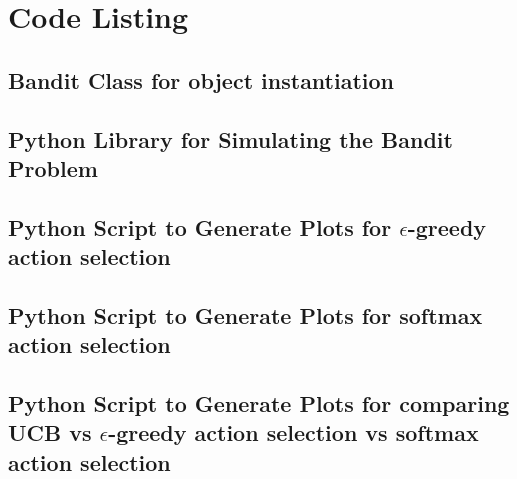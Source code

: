 \documentclass[english]{article}
\begin{document}
\section{Code Listing}
\subsection{Bandit Class for object instantiation}

\subsection{Python Library for Simulating the Bandit Problem}

\subsection{Python Script to Generate Plots for $\epsilon$-greedy action selection}

\subsection{Python Script to Generate Plots for softmax action selection}

\subsection{Python Script to Generate Plots for comparing UCB vs $\epsilon$-greedy action selection vs softmax action selection}

\end{document}
